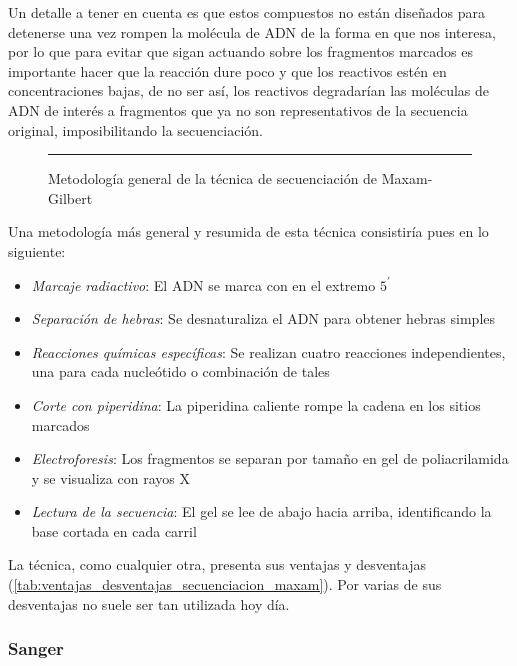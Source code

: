 \documentclass{AsignaturaResumen}
\begin{document}
Un detalle a tener en cuenta es que estos compuestos no están diseñados para detenerse una vez rompen la molécula de ADN de la forma en que nos interesa, por lo que para evitar que sigan actuando sobre los fragmentos marcados es importante hacer que la reacción dure poco y que los reactivos estén en concentraciones bajas, de no ser así, los reactivos degradarían las moléculas de ADN de interés a fragmentos que ya no son representativos de la secuencia original, imposibilitando la secuenciación.

\begin{figure}\centering
    \resizebox{\linewidth}{!}{}
    \rule{\linewidth}{0.5pt}
    \caption{Metodología general de la técnica de secuenciación de Maxam-Gilbert}
    \label{fig:esquema_secuenciacion_g1_maxam}
\end{figure}

Una metodología más general y resumida de esta técnica consistiría pues en lo siguiente: 

\begin{itemize}
    \item \emph{Marcaje radiactivo}: El ADN se marca con  en el extremo $5^{\prime}$
    \item \emph{Separación de hebras}: Se desnaturaliza el ADN para obtener hebras simples
    \item \emph{Reacciones químicas específicas}: Se realizan cuatro reacciones independientes, una para cada nucleótido o combinación de tales
    \item \emph{Corte con piperidina}: La piperidina caliente rompe la cadena en los sitios marcados
    \item \emph{Electroforesis}: Los fragmentos se separan por tamaño en gel de poliacrilamida y se visualiza con rayos X
    \item \emph{Lectura de la secuencia}: El gel se lee de abajo hacia arriba, identificando la base cortada en cada carril
\end{itemize}

La técnica, como cualquier otra, presenta sus ventajas y desventajas (\autoref{tab:ventajas_desventajas_secuenciacion_maxam}). Por varias de sus desventajas no suele ser tan utilizada hoy día.

    



\subsubsection{Sanger}
\FloatBarrier
\end{document}
